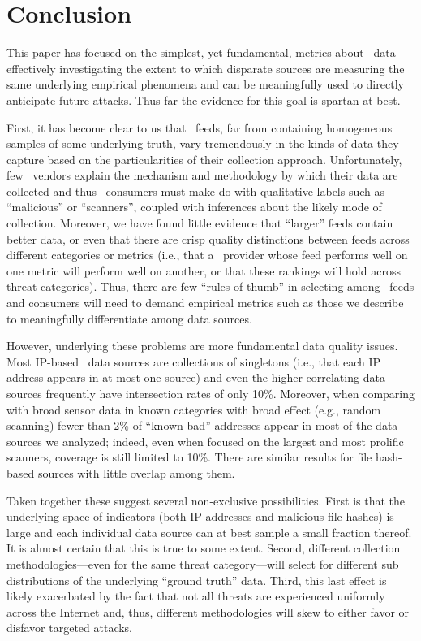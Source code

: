 \section{Conclusion}
\label{sec:old_conclusion}

This paper has focused on the simplest, yet fundamental, metrics about
\ti\ data---effectively investigating the extent to which disparate
sources are measuring the same underlying empirical phenomena and can
be meaningfully used to directly anticipate future attacks.  Thus far
the evidence for this goal is spartan at best.

First, it has become clear to us that \ti\ feeds, far from containing
homogeneous samples of some underlying truth, vary tremendously in the
kinds of data they capture based on the particularities of their
collection approach.  Unfortunately, few \ti\ vendors explain the
mechanism and methodology by which their data are collected and thus
\ti\ consumers must make do with qualitative labels such as
``malicious'' or ``scanners'', coupled with inferences about the
likely mode of collection.  Moreover, we have found little evidence
that ``larger'' feeds contain better data, or even that there are
crisp quality distinctions between feeds across different categories
or metrics (i.e., that a \ti\ provider whose feed performs well on one
metric will perform well on another, or that these rankings will hold
across threat categories).  Thus, there are few ``rules of thumb'' in
selecting among \ti\ feeds and consumers will need to demand
empirical metrics such as those we describe to meaningfully
differentiate among data sources.

However, underlying these problems are more fundamental data quality
issues.  Most IP-based \ti\ data sources are collections of
singletons (i.e., that each IP address appears in at most one source)
and even the higher-correlating data sources frequently have
intersection rates of only 10\%.  Moreover, when comparing with broad
sensor data in known categories with broad effect (e.g., random
scanning) fewer than 2\% of ``known bad'' addresses appear in most of
the data sources we analyzed; indeed, even when focused on the largest
and most prolific scanners, coverage is still limited to 10\%.  There
are similar results for file hash-based sources with little overlap
among them.

Taken together these suggest several non-exclusive possibilities.
First is that the underlying space of indicators (both IP addresses
and malicious file hashes) is large and each individual data source
can at best sample a small fraction thereof.  It is almost certain
that this is true to some extent.  Second, different collection
methodologies---even for the same threat category---will select for
different sub distributions of the underlying ``ground truth'' data.
Third, this last effect is likely exacerbated by the fact that not all
threats are experienced uniformly across the Internet and, thus,
different methodologies will skew to either favor or disfavor targeted
attacks.

